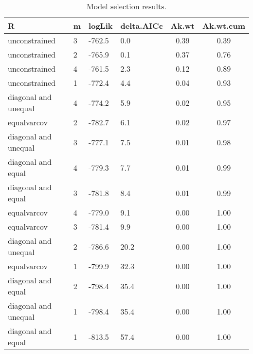 \begin{table}[htp]
\centering
\caption{Model selection results.} 
\label{tab:tablefits}
\begin{tabular}{p{3.5cm}p{0.7cm}p{1.5cm}p{1.75cm}cc}
  \hline
R & m & logLik & delta.AICc & Ak.wt & Ak.wt.cum \\ 
  \hline
unconstrained &  3 & -762.5 & 0.0 & 0.39 & 0.39 \\ 
  unconstrained &  2 & -765.9 & 0.1 & 0.37 & 0.76 \\ 
  unconstrained &  4 & -761.5 & 2.3 & 0.12 & 0.89 \\ 
  unconstrained &  1 & -772.4 & 4.4 & 0.04 & 0.93 \\ 
  diagonal and unequal &  4 & -774.2 & 5.9 & 0.02 & 0.95 \\ 
  equalvarcov &  2 & -782.7 & 6.1 & 0.02 & 0.97 \\ 
  diagonal and unequal &  3 & -777.1 & 7.5 & 0.01 & 0.98 \\ 
  diagonal and equal &  4 & -779.3 & 7.7 & 0.01 & 0.99 \\ 
  diagonal and equal &  3 & -781.8 & 8.4 & 0.01 & 0.99 \\ 
  equalvarcov &  4 & -779.0 & 9.1 & 0.00 & 1.00 \\ 
  equalvarcov &  3 & -781.4 & 9.9 & 0.00 & 1.00 \\ 
  diagonal and unequal &  2 & -786.6 & 20.2 & 0.00 & 1.00 \\ 
  equalvarcov &  1 & -799.9 & 32.3 & 0.00 & 1.00 \\ 
  diagonal and equal &  2 & -798.4 & 35.4 & 0.00 & 1.00 \\ 
  diagonal and unequal &  1 & -798.4 & 35.4 & 0.00 & 1.00 \\ 
  diagonal and equal &  1 & -813.5 & 57.4 & 0.00 & 1.00 \\ 
   \hline
\end{tabular}
\end{table}
